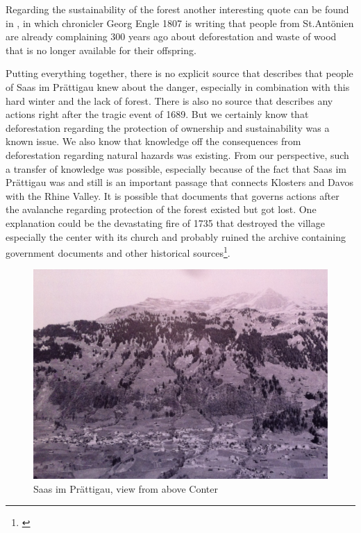 \documentclass[12pt, a4paper]{article}
\begin{document}
Regarding the sustainability of the forest another interesting quote can be found in \citet[p.~7]{finze1988geschichte}, 
in which chronicler Georg Engle 1807 is writing that people from St.Antönien are already complaining 300 years ago about 
deforestation and waste of wood that is no longer available for their offspring. 

Putting everything together, there is no explicit source that describes that people of Saas im Prättigau knew about the 
danger, especially in combination with this hard winter and the lack of forest. There is also no source that describes 
any actions right after the tragic event of 1689. But we certainly know that deforestation regarding the protection of 
ownership and sustainability was a known issue. We also know that knowledge off the consequences from deforestation 
regarding natural hazards was existing. From our perspective, such a transfer of knowledge was possible, especially because 
of the fact that Saas im Prättigau was and still is an important passage that connects Klosters and Davos with the 
Rhine Valley. It is possible that documents that governs actions after the avalanche regarding protection of the 
forest existed but got lost. One explanation could be the devastating fire of 1735 that destroyed the village especially the 
center with its church and probably ruined the archive containing government documents and other historical 
sources\footnote{\citet[p.~55]{hansemann1995saaser}}.

\begin{figure}
\begin{center}
\includegraphics[width=\textwidth,natwidth=610,natheight=642]{literature/saas.jpg}
\end{center}
\caption{Saas im Prättigau, view from above Conter \citep[p.~216]{hansemann1995saaser}}
\end{figure} 
\end{document}
